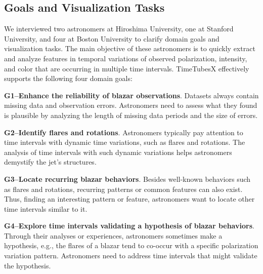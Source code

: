 \subsection{Goals and Visualization Tasks}\label{sec:domainGoalsandTasks}
We interviewed two astronomers at Hiroshima University, one at Stanford University, and four at Boston University to clarify domain goals and visualization tasks.
The main objective of these astronomers is 
to quickly extract and analyze features in temporal variations of observed polarization, intensity, and color that are occurring in multiple time intervals. 
TimeTubesX effectively supports the following four domain goals:

\noindent\textbf{G1--Enhance the reliability of blazar observations}. 
Datasets always contain missing data and observation errors. 
Astronomers need to assess what they found is plausible by analyzing the length of missing data periods and the size of errors.

\noindent\textbf{G2--Identify flares and rotations}. 
Astronomers typically pay attention to time intervals with dynamic time variations, %
such as flares and rotations.
The analysis of time intervals with such dynamic variations helps astronomers demystify the jet's structures.

\noindent\textbf{G3--Locate recurring blazar behaviors}.
Besides well-known behaviors such as flares and rotations, 
recurring patterns or common features can also exist.
Thus, finding an interesting pattern or feature, 
astronomers want to locate other time intervals similar to it.

\noindent\textbf{G4--Explore time intervals validating a hypothesis of blazar behaviors}.
Through their analyses or experiences, astronomers sometimes make a hypothesis, e.g., the flares of a blazar tend to co-occur with a specific polarization variation pattern. 
Astronomers need to address time intervals that might validate the hypothesis.

